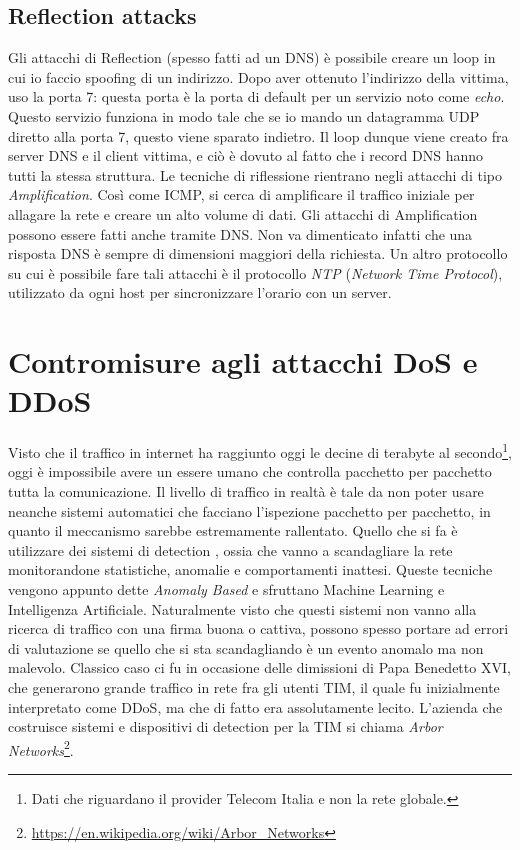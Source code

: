 \documentclass[14pt]{extreport}
\begin{document}
\subsection{Reflection attacks}
Gli attacchi di Reflection (spesso fatti ad un DNS) è possibile creare un loop in cui io faccio spoofing di un indirizzo. Dopo aver ottenuto l'indirizzo della vittima, uso la porta 7: questa porta è la porta di default per un servizio noto come \textit{echo}. Questo servizio funziona in modo tale che se io mando un datagramma UDP diretto alla porta 7, questo viene sparato indietro. Il loop dunque viene creato fra server DNS e il client vittima, e ciò è dovuto al fatto che i record DNS hanno tutti la stessa struttura. Le tecniche di riflessione rientrano negli attacchi di tipo \textit{Amplification}. Così come ICMP, si cerca di amplificare il traffico iniziale per allagare la rete e creare un alto volume di dati. Gli attacchi di Amplification possono essere fatti anche tramite DNS. Non va dimenticato infatti che una risposta DNS è sempre di dimensioni maggiori della richiesta. Un altro protocollo su cui è possibile fare tali attacchi è il protocollo \textit{NTP} (\textit{Network Time Protocol}), utilizzato da ogni host per sincronizzare l'orario con un server.




\section{Contromisure agli attacchi DoS e DDoS}
Visto che il traffico in internet ha raggiunto oggi le decine di terabyte al secondo\footnote{Dati che riguardano il provider Telecom Italia e non la rete globale.}, oggi è impossibile avere un essere umano che controlla pacchetto per pacchetto tutta la comunicazione. Il livello di traffico in realtà è tale da non poter usare neanche sistemi automatici che facciano l'ispezione pacchetto per pacchetto, in quanto il meccanismo sarebbe estremamente rallentato. Quello che si fa è utilizzare dei sistemi di detection , ossia che vanno a scandagliare la rete monitorandone statistiche, anomalie e comportamenti inattesi. Queste tecniche vengono appunto dette \textit{Anomaly Based} e sfruttano Machine Learning e Intelligenza Artificiale. Naturalmente visto che questi sistemi non vanno alla ricerca di traffico con una firma buona o cattiva, possono spesso portare ad errori di valutazione se quello che si sta scandagliando è un evento anomalo ma non malevolo. Classico caso ci fu in occasione delle dimissioni di Papa Benedetto XVI, che generarono grande traffico in rete fra gli utenti TIM, il quale fu inizialmente interpretato come DDoS, ma che di fatto era assolutamente lecito.\newline
L'azienda che costruisce sistemi e dispositivi di detection per la TIM si chiama \textit{Arbor Networks}\footnote{\url{https://en.wikipedia.org/wiki/Arbor_Networks}}.
\end{document}
